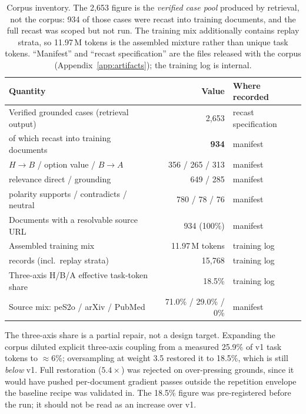 \begin{table}[t]
\centering
\caption{Corpus inventory. The 2{,}653 figure is the \emph{verified case pool} produced by
retrieval, not the corpus: 934 of those cases were recast into training documents, and the full
recast was scoped but not run. The training mix additionally contains replay strata, so 11.97\,M
tokens is the assembled mixture rather than unique task tokens. ``Manifest'' and ``recast
specification'' are the files released with the corpus (Appendix~\ref{app:artifacts}); the
training log is internal.}
\label{tab:corpus}\small
\begin{tabular}{lr l}
\toprule
Quantity & Value & Where recorded \\
\midrule
Verified grounded cases (retrieval output) & 2{,}653 & recast specification \\
\quad of which recast into training documents & \textbf{934} & manifest \\
\quad\quad $H\!\to\!B$ / option value / $B\!\to\!A$ & 356 / 265 / 313 & manifest \\
\quad\quad relevance direct / grounding & 649 / 285 & manifest \\
\quad\quad polarity supports / contradicts / neutral & 780 / 78 / 76 & manifest \\
Documents with a resolvable source URL & 934 (100\%) & manifest \\
Assembled training mix & 11.97\,M tokens & training log \\
\quad records (incl.\ replay strata) & 15{,}768 & training log \\
Three-axis H/B/A effective task-token share & 18.5\% & training log \\
Source mix: peS2o / arXiv / PubMed & 71.0\% / 29.0\% / 0\% & manifest \\
\bottomrule
\end{tabular}
\end{table}

The three-axis share is a partial repair, not a design target. Expanding the corpus diluted
explicit three-axis coupling from a measured 25.9\% of v1 task tokens to $\approx$6\%; oversampling
at weight 3.5 restored it to 18.5\%, which is still \emph{below} v1. Full restoration ($5.4\times$)
was rejected on over-pressing grounds, since it would have pushed per-document gradient passes outside
the repetition envelope the baseline recipe was validated in. The 18.5\% figure was pre-registered
before the run; it should not be read as an increase over v1.

